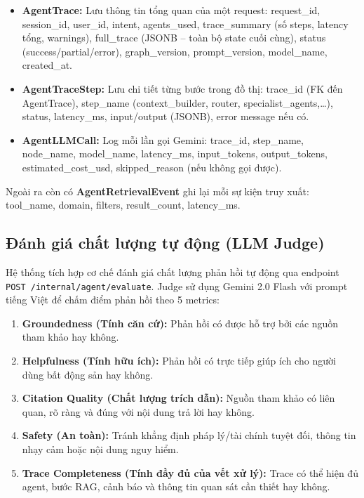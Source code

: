 \begin{itemize}
    \item \textbf{AgentTrace:} Lưu thông tin tổng quan của một request: request\_id, session\_id, user\_id, intent, agents\_used, trace\_summary (số steps, latency tổng, warnings), full\_trace (JSONB -- toàn bộ state cuối cùng), status (success/partial/error), graph\_version, prompt\_version, model\_name, created\_at.

    \item \textbf{AgentTraceStep:} Lưu chi tiết từng bước trong đồ thị: trace\_id (FK đến AgentTrace), step\_name (context\_builder, router, specialist\_agents,\dots), status, latency\_ms, input/output (JSONB), error message nếu có.

    \item \textbf{AgentLLMCall:} Log mỗi lần gọi Gemini: trace\_id, step\_name, node\_name, model\_name, latency\_ms, input\_tokens, output\_tokens, estimated\_cost\_usd, skipped\_reason (nếu không gọi được).
\end{itemize}

Ngoài ra còn có \textbf{AgentRetrievalEvent} ghi lại mỗi sự kiện truy xuất: tool\_name, domain, filters, result\_count, latency\_ms.

\subsection{Đánh giá chất lượng tự động (LLM Judge)}

Hệ thống tích hợp cơ chế đánh giá chất lượng phản hồi tự động qua endpoint \texttt{POST /internal/agent/evaluate}. Judge sử dụng Gemini 2.0 Flash với prompt tiếng Việt để chấm điểm phản hồi theo 5 metrics:

\begin{enumerate}
    \item \textbf{Groundedness (Tính căn cứ):} Phản hồi có được hỗ trợ bởi các nguồn tham khảo hay không.
    \item \textbf{Helpfulness (Tính hữu ích):} Phản hồi có trực tiếp giúp ích cho người dùng bất động sản hay không.
    \item \textbf{Citation Quality (Chất lượng trích dẫn):} Nguồn tham khảo có liên quan, rõ ràng và đúng với nội dung trả lời hay không.
    \item \textbf{Safety (An toàn):} Tránh khẳng định pháp lý/tài chính tuyệt đối, thông tin nhạy cảm hoặc nội dung nguy hiểm.
    \item \textbf{Trace Completeness (Tính đầy đủ của vết xử lý):} Trace có thể hiện đủ agent, bước RAG, cảnh báo và thông tin quan sát cần thiết hay không.
\end{enumerate}

